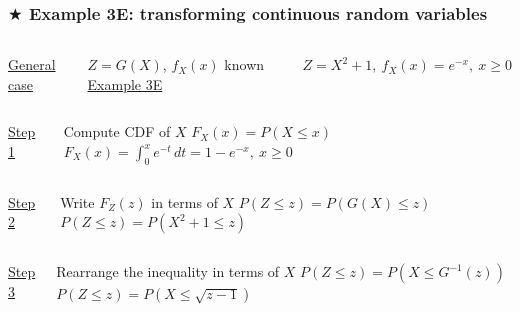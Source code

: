 \documentclass[t,8pt]{beamer}
\begin{document}
\begin{frame}[t]
	\frametitle{$\bigstar$ Example 3E: transforming continuous random variables}
	{\small
		\begin{minipage}{\textwidth}
			\begin{columns}[T]
				\underline{General case} \par
				$Z=G(X)$, $f_X(x)$ known
				\underline{Example 3E} \par
				$Z=X^2+1,\ f_X(x)=e^{-x},\ x\geq 0$
			\end{columns}
		\end{minipage}\par
		\begin{minipage}{\textwidth}
			\begin{columns}[T]
				\underline{Step 1} \par
				Compute CDF of $X$
				\hfill\break\hfill\break
				$F_X(x)=P(X\leq x)$
				\column{0.4\textwidth}
				\hfill\break\hfill\break
				$F_X(x)=\int_0^x e^{-t}\,dt
				=1-e^{-x},\ x\ge 0$
			\end{columns}
		\end{minipage}\par
		\begin{minipage}{\textwidth}
			\begin{columns}[T]
				\column{0.17\textwidth}
				\underline{Step 2} \par
				Write $F_Z(z)$ in terms of $X$
				\column{0.35\textwidth}
				\hfill\break\hfill\break
				$P(Z\leq z)=P(G(X)\leq z)$
				\hfill\break\hfill\break
				$P(Z\leq z)=P(X^2+1\leq z)$
			\end{columns}
		\end{minipage}\par
		\begin{minipage}{\textwidth}
			\begin{columns}[T]
				\underline{Step 3} \par
				Rearrange the inequality in terms of $X$
				\hfill\break\hfill\break
				$P(Z\leq z)=P(X\leq G^{-1}(z))$
				\hfill\break\hfill\break
				$P(Z\leq z)=P(X\leq \sqrt{z-1})$
			\end{columns}
		\end{minipage}\par
		\begin{minipage}{\textwidth}

\end{minipage}}
\end{frame}
\end{document}
